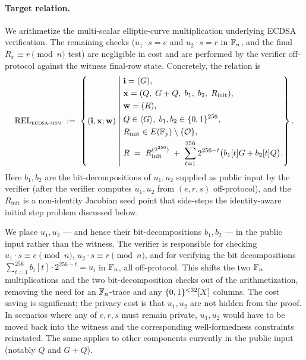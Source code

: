 \paragraph{Target relation.}
We arithmetize the multi-scalar elliptic-curve multiplication
underlying ECDSA verification. The remaining checks
($u_1 \cdot s = e$ and $u_2 \cdot s = r$ in $\mathbb{F}_n$, and the final
$R_x \equiv r \pmod n$ test) are negligible in cost and are performed
by the verifier off-protocol against the witness final-row state.
Concretely, the relation is
\begin{equation}\label{eq:rel-ecdsa}
\mathrm{REL}_{\textsc{ecdsa-msm}} \;:=\;
\left\{(\mathbf{i},\mathbf{x};\mathbf{w}) \;\middle|\;
\begin{aligned}
&\mathbf{i} = (G), \\
&\mathbf{x} = (Q,\;G+Q,\;b_1,\;b_2,\;R_{\mathrm{init}}), \\
&\mathbf{w} = (R), \\
&Q \in \langle G \rangle,\; b_1, b_2 \in \{0,1\}^{256}, \\
&R_{\mathrm{init}} \in E(\mathbb{F}_p) \setminus \{\mathcal{O}\}, \\
&R \;=\; R_{\mathrm{init}}^{(2^{256})} \;+\; \sum_{t=1}^{256} 2^{256-t}\bigl(b_1[t] G + b_2[t] Q\bigr).
\end{aligned}\right\}.
\end{equation}
Here $b_1, b_2$ are the bit-decompositions of $u_1, u_2$ supplied as
public input by the verifier (after the verifier computes
$u_1, u_2$ from $(e, r, s)$ off-protocol), and the
$R_{\mathrm{init}}$ is a non-identity Jacobian seed point that
side-steps the identity-aware initial step problem discussed below.

\begin{remark}
\label{rem:public-u}
We place $u_1, u_2$ — and hence their bit-decompositions $b_1, b_2$ — in
the public input rather than the witness. The verifier is responsible
for checking $u_1 \cdot s \equiv e \pmod n$, $u_2 \cdot s \equiv r \pmod n$,
and for verifying the bit decompositions
$\sum_{t=1}^{256} b_i[t] \cdot 2^{256-t} = u_i$ in $\mathbb{F}_n$, all
off-protocol. This shifts the two $\mathbb{F}_n$ multiplications and the two
bit-decomposition checks out of the arithmetization, removing the
need for an $\mathbb{F}_n$-trace and any $\{0,1\}^{<32}[X]$ columns. The cost
saving is significant; the privacy cost is that $u_1, u_2$ are
not hidden from the proof. In scenarios where any of $e, r, s$ must
remain private, $u_1, u_2$ would have to be moved back into the
witness and the corresponding well-formedness constraints reinstated.
The same applies to other components currently in the public input
(notably $Q$ and $G+Q$).
\end{remark}

